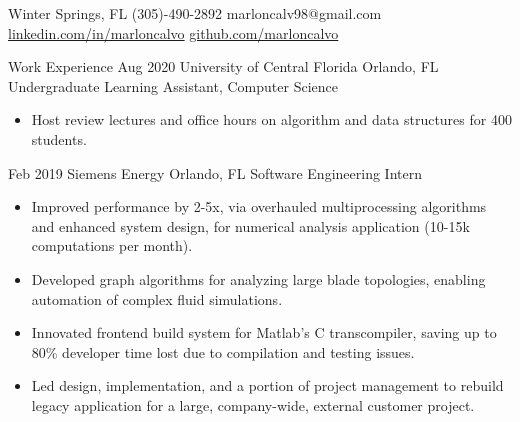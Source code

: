 \documentclass{resume}
\begin{document}
  \contact
    {Winter Springs, FL}
    {(305)-490-2892}
    {marloncalv98@gmail.com}
    {\href{https://www.linkedin.com/in/marloncalvo/}{linkedin.com/in/marloncalvo}}
    {\href{https://github.com/marloncalvo/}{github.com/marloncalvo}}
  \begin{fieldlist}{Work Experience}
    \field
      {Aug 2020}
      {University of Central Florida}
      {Orlando, FL}
      {Undergraduate Learning Assistant, Computer Science}
      {
        \begin{itemize}
          \setlength\itemsep{0em}
          \item Host review lectures and office hours on algorithm and data structures for 400 students. 
        \end{itemize}
      }


      \field
        {Feb 2019}
        {Siemens Energy}
        {Orlando, FL}
        {Software Engineering Intern}
        {
          \begin{itemize}
            \setlength\itemsep{0em}
            \item Improved performance by 2-5x, via overhauled multiprocessing algorithms and enhanced system design, for numerical analysis application (10-15k computations per month).
            \item Developed graph algorithms for analyzing large blade topologies, enabling automation of complex fluid simulations.
            \item Innovated frontend build system for Matlab's C transcompiler, saving up to 80\% developer time lost due to compilation and testing issues.
            \item Led design, implementation, and a portion of project management to rebuild legacy application for a large, company-wide, external customer project.
          \end{itemize}
        }

  \end{fieldlist}
\end{document}
